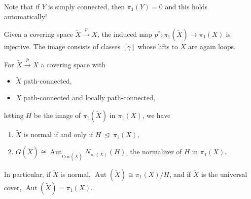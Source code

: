 \begin{remark}

Note that if \(Y\) is simply connected, then \(\pi_1(Y) = 0\) and this
holds automatically!

\end{remark}

\begin{proposition}

Given a covering space \(\tilde X \xrightarrow{p} X\), the induced map
\(p^*: \pi_1(\tilde X) \to \pi_1(X)\) is injective. The image consists
of classes \([\gamma]\) whose lifts to \(\tilde X\) are again loops.

\end{proposition}

\begin{theorem}

For \(\tilde X \xrightarrow{p} X\) a covering space with

\begin{itemize}
\tightlist
\item
  \(\tilde X\) path-connected,
\item
  \(X\) path-connected and locally path-connected,
\end{itemize}

letting \(H\) be the image of \(\pi_1(\tilde X)\) in \(\pi_1(X)\), we
have

\begin{enumerate}
\def\labelenumi{\arabic{enumi}.}
\item
  \(\tilde X\) is normal if and only if
  \(H{~\trianglelefteq~}\pi_1(X)\),
\item
  \(G(\tilde X) \cong {\operatorname{Aut}}_{\mathrm{Cov}(\tilde X) } N_{\pi_1(X)}(H)\),
  the normalizer of \(H\) in \(\pi_1(X)\).
\end{enumerate}

In particular, if \(\tilde X\) is normal,
\({\operatorname{Aut}}(\tilde X) \cong \pi_1(X) / H\), and if
\(\tilde X\) is the universal cover,
\({\operatorname{Aut}}(\tilde X) = \pi_1(X)\).

\end{theorem}

